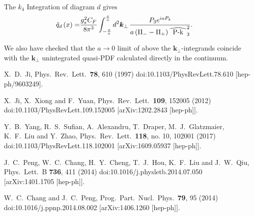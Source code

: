 \documentclass[english,preprint,aps,prd,showpacs,superscriptaddress,nofootinbib,tightenlines]{revtex4}
\renewcommand\widehat[1]{%
\savestack{\tmpbox}{\stretchto{%
  \scaleto{%
    \scalerel*[\widthof{\ensuremath{#1}}]{\kern-.6pt\bigwedge\kern-.6pt}%
    {\rule[-\textheight/2]{1ex}{\textheight}}%
  }{\textheight}%
}{0.5ex}}%
\stackon[1pt]{#1}{\tmpbox}%
}
\begin{document}
The $k_{4}$ Integration of diagram $d$ gives
\begin{align}
\tilde{q}_{d}\left(x\right)= & \frac{g_{s}^{2}C_{F}}{8\pi^{3}}\int_{-\frac{\pi}{a}}^{\frac{\pi}{a}}d^{2}\boldsymbol{k}_{\perp}\,\frac{P_{3}e^{iaP_{4}}}{a\left(\Pi_{-}-\Pi_{+}\right)\widehat{P-k}_{3}^{2}}.\label{eq:fd0k4Inted}
\end{align}

We also have checked that the $a\rightarrow 0$ limit of above the $\boldsymbol{k}_\perp$-integrands coincide with the $\boldsymbol{k}_\perp$
unintegrated quasi-PDF calculated directly in the continuum.

\begin{thebibliography}{99}

  X.~D.~Ji,
  Phys.\ Rev.\ Lett.\  {\bf 78}, 610 (1997)
  doi:10.1103/PhysRevLett.78.610
  [hep-ph/9603249].

  X.~Ji, X.~Xiong and F.~Yuan,
  Phys.\ Rev.\ Lett.\  {\bf 109}, 152005 (2012)
  doi:10.1103/PhysRevLett.109.152005
  [arXiv:1202.2843 [hep-ph]].

  Y.~B.~Yang, R.~S.~Sufian, A.~Alexandru, T.~Draper, M.~J.~Glatzmaier, K.~F.~Liu and Y.~Zhao,
  Phys.\ Rev.\ Lett.\  {\bf 118}, no. 10, 102001 (2017)
  doi:10.1103/PhysRevLett.118.102001
  [arXiv:1609.05937 [hep-ph]].

  J.~C.~Peng, W.~C.~Chang, H.~Y.~Cheng, T.~J.~Hou, K.~F.~Liu and J.~W.~Qiu,
  Phys.\ Lett.\ B {\bf 736}, 411 (2014)
  doi:10.1016/j.physletb.2014.07.050
  [arXiv:1401.1705 [hep-ph]].

  W.~C.~Chang and J.~C.~Peng,
  Prog.\ Part.\ Nucl.\ Phys.\  {\bf 79}, 95 (2014)
  doi:10.1016/j.ppnp.2014.08.002
  [arXiv:1406.1260 [hep-ph]].


\end{thebibliography}
\end{document}
